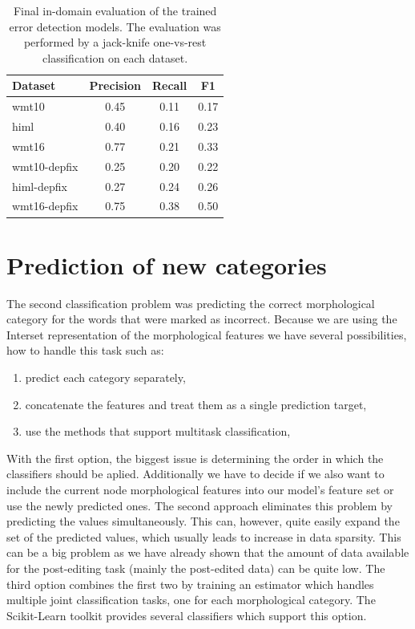 
\begin{table}[t]
\centering
\small

\begin{tabular}{l|ccc}
Dataset  &  Precision  &  Recall  &  F1  \\
\hline
wmt10  &  0.45  &  0.11  &  0.17  \\
himl  &  0.40  &  0.16  &  0.23  \\
wmt16  &  0.77  &  0.21  &  0.33  \\
wmt10-depfix  &  0.25  &  0.20  &  0.22  \\
himl-depfix  &  0.27  &  0.24  &  0.26  \\
wmt16-depfix  &  0.75  &  0.38  &  0.50  \\
\end{tabular}
\caption{
    Final in-domain evaluation of the trained error detection models. The evaluation was performed
by a jack-knife one-vs-rest classification on each dataset. 
}
\label{wf-summary}
\end{table}


\section{Prediction of new categories}

The second classification problem was predicting the correct morphological category for
the words that were marked as incorrect. Because we are using the Interset representation
of the morphological features we have several possibilities, how to handle this task such
as:
\begin{enumerate}
    \item predict each category separately,
    \item concatenate the features and treat them as a single prediction target,
    \item use the methods that support multitask classification,
\end{enumerate}

With the first option, the biggest issue is determining the order in which the classifiers
should be aplied. Additionally we have to decide if we also want to include the current node morphological features
into our model's feature set or use the newly predicted ones. The second approach eliminates this problem by predicting the
values simultaneously. This can, however, quite easily expand the set of the predicted values,
which usually leads to increase in data sparsity. This can be a big problem as we have
already shown that the amount of data available for the post-editing task (mainly the post-edited
data) can be quite low. The third option combines the first two by training an estimator
which handles multiple joint classification tasks, one for each morphological category. The
Scikit-Learn toolkit provides several classifiers which support this option.

